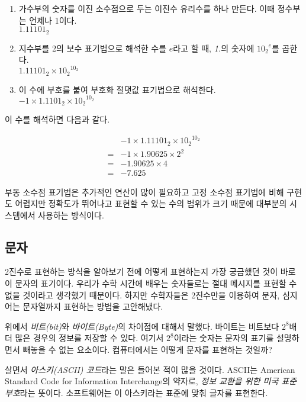 \documentclass{article}
\begin{document}
\begin{enumerate}
    \item 가수부의 숫자를 이진 소수점으로 두는 이진수 유리수를 하나 만든다. 이때 정수부는 언제나 1이다. \\
          $1.11101_2$
    \item 지수부를 2의 보수 표기법으로 해석한 수를 $e$라고 할 때, \textit{1.}의 숫자에 ${10_2}^e$를 곱한다. \\
          $1.11101_2 \times {10_2}^{10_2}$
    \item 이 수에 부호를 붙여 부호화 절댓값 표기법으로 해석한다. \\
          $-1 \times 1.1101_2 \times {10_2}^{10_2}$
\end{enumerate}

이 수를 해석하면 다음과 같다.

$$
\begin{aligned}
     & -1 \times 1.11101_2 \times {10_2}^{10_2} \\
    =& -1 \times 1.90625 \times 2^2 \\
    =& -1.90625 \times 4 \\
    =& -7.625
\end{aligned}
$$

부동 소수점 표기법은 추가적인 연산이 많이 필요하고 고정 소수점 표기법에 비해 구현도 어렵지만
정확도가 뛰어나고 표현할 수 있는 수의 범위가 크기 때문에
대부분의 시스템에서 사용하는 방식이다.

\subsection{문자}

2진수로 표현하는 방식을 알아보기 전에 어떻게 표현하는지 가장 궁금했던 것이 바로 이 문자의
표기이다. 우리가 수학 시간에 배우는 숫자들로는 절대 메시지를 표현할 수 없을 것이라고 생각했기
때문이다. 하지만 수학자들은 2진수만을 이용하여 문자, 심지어는 문자열까지 표현하는 방법을
고안해냈다.

위에서 \textit{비트(bit)}와 \textit{바이트(Byte)}의 차이점에 대해서 말했다.
바이트는 비트보다 $2^8$배 더
많은 경우의 정보를 저장할 수 있다. 여기서 $2^8$이라는 숫자는 문자의 표기를 설명하면서 빼놓을
수 없는 요소이다. 컴퓨터에서는 어떻게 문자를 표현하는 것일까?

살면서 \textit{아스키(ASCII) 코드}라는 말은 들어본 적이 많을 것이다.
ASCII는 American Standard Code for Information Interchange의 약자로,
\textit{정보 교환을 위한 미국 표준 부호}라는
뜻이다. 소프트웨어는 이 아스키라는 표준에 맞춰 글자를 표현한다.
\end{document}
